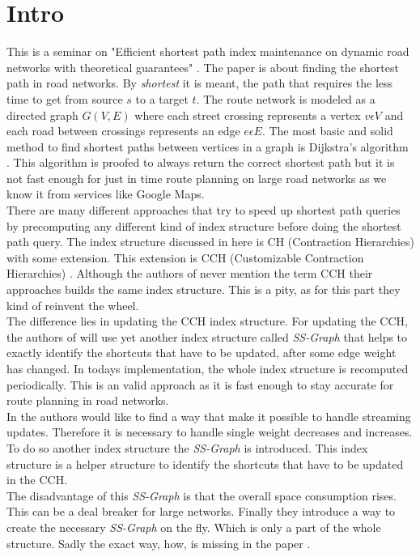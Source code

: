 \documentclass[twocolumn]{article}
\begin{document}


\section{Intro}

This is a seminar on "Efficient shortest path index maintenance on dynamic
road networks with theoretical guarantees" \cite{Ouyang2020}. The paper is
about finding the shortest path in road networks. By \textit{shortest} it is meant,
the path that requires the less time to get from source $s$ to a target $t$. The route
network is modeled as a directed graph $G(V,E)$ where each street crossing represents a
vertex $v \epsilon V$ and each road between crossings represents an edge $e \epsilon E$.
The most basic and solid method to find shortest paths between vertices in a graph is
Dijkstra's algorithm \cite{Dijkstra1959}. This algorithm is proofed to always return the
correct shortest path but it is not fast enough for just in time route planning on large
road networks as we know it from services like Google Maps.
\\
There are many
different approaches that try to speed up shortest path queries by precomputing
any different kind of index structure before doing the shortest path query. The index
structure discussed in here \cite{Ouyang2020} is CH (Contraction Hierarchies)\cite{Geisberger2012}
with some extension. This extension is CCH (Customizable Contraction Hierarchies)
\cite{Dibbelt2014}. Although the authors of \cite{Ouyang2020} never mention the term
CCH their approaches builds the same index structure. This is a pity, as for this part
they kind of reinvent the wheel.
\\
The difference lies in updating
the CCH index structure. For updating the CCH, the authors of \cite{Ouyang2020} will use yet another
index structure called \textit{SS-Graph} that helps to exactly identify the shortcuts that
have to be updated, after some edge weight has changed. In todays implementation, the whole
index structure is recomputed periodically. This is an valid approach as it is fast enough
to stay accurate for route planning in road networks.
\\
In \cite{Ouyang2020} the authors would like to find a way that make it possible to handle streaming
updates. Therefore it is necessary to handle single weight decreases
and increases. To do so another index structure the \textit{SS-Graph} is introduced.
This index structure is a helper structure to identify the shortcuts
that have to be updated in the CCH.
\\
The disadvantage of this \textit{SS-Graph} is that the overall space consumption rises.
This can be a deal breaker for large networks.
Finally they introduce a way to create the necessary \textit{SS-Graph} on the fly. Which
is only a part of the whole structure.
Sadly the exact way, how, is missing in the paper \cite{Ouyang2020}.
\end{document}
